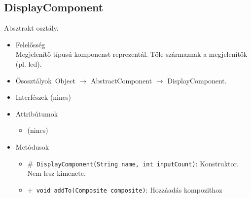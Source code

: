 \subsection{DisplayComponent}
Absztrakt osztály.
\begin{itemize}
\item Felelősség\\
Megjelenítő típusú komponenst reprezentál. Tőle származnak a megjelenítők (pl. led).
\item Ősosztályok\ Object $\rightarrow{}$ AbstractComponent $\rightarrow{}$ DisplayComponent.
\item Interfészek (nincs)
\item Attribútumok $\ $
\begin{itemize}
\item (nincs)
\end{itemize}
\item Metódusok$\ $
\begin{itemize}
	\item[] \texttt{$\#$ DisplayComponent(String name, int inputCount)}: Konstruktor. Nem lesz kimenete.
	\item[] \texttt{$+$ void addTo(Composite composite)}: Hozzáadás kompozithoz
\end{itemize}
\end{itemize}

